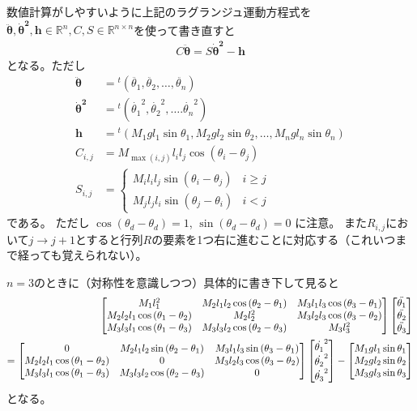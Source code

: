 \documentclass{jsarticle}
\newcommand{\eqa}[1]{\begin{align}#1\end{align}}
\newcommand{\cost}[2]{\cos\left(\theta_{#1}-\theta_{#2}\right)}
\newcommand{\sint}[2]{\sin\left(\theta_{#1}-\theta_{#2}\right)}
\newcommand{\dott}[1]{\dot{\theta_{#1}}}
\newcommand{\ddott}[1]{\ddot{\theta_{#1}}}
\begin{document}
数値計算がしやすいように上記のラグランジュ運動方程式を$\bm{\ddot{\theta}}, \bm{\dot{\theta}^2}, \bm{h} \in \mathbb{R}^n, C, S \in \mathbb{R}^{n\times n}$を使って書き直すと
\eqa{
	C \bm{\ddot{\theta}} = S \bm{\dot{\theta}^2} - \bm{h}
}
となる。ただし
\eqa{
	\bm{\ddot{\theta}} &= {}^t(\ddott{1}, \ddott{2}, \dots, \ddott{n}) \\
	\bm{\dot{\theta}^2} &= {}^t(\dott{1}^2, \dott{2}^2, \dots. \dott{n}^2) \\
	\bm{h} &= {}^t(M_1 g l_1 \sin\theta_1, M_2 g l_2 \sin\theta_2, \dots, M_n g l_n \sin\theta_n) \\
	C_{i,j} &= M_{\max(i, j)} l_i l_j \cost{i}{j} \\
	S_{i,j} &= \begin{cases}
		M_i l_i l_j \sint{i}{j} & \text{$i \ge j$}\\
		M_j l_j l_i \sint{j}{i} & \text{$i < j$}
	\end{cases}
}
である。
ただし $\cost{d}{d} = 1$, $\sint{d}{d} = 0$ に注意。
また$R_{i,j}$において$j\rightarrow j+1$とすると行列$R$の要素を1つ右に進むことに対応する（これいつまで経っても覚えられない）。

$n=3$のときに（対称性を意識しつつ）具体的に書き下して見ると
\eqa{
	\begin{bmatrix}
		M_1 l_1^2 & M_2 l_1 l_2 \cost{2}{1} & M_3 l_1 l_3 \cost{3}{1} \\
		M_2 l_2 l_1 \cost{1}{2} & M_2 l_2^2 & M_3 l_2 l_3 \cost{3}{2} \\
		M_3 l_3 l_1 \cost{1}{3} & M_3 l_3 l_2 \cost{2}{3} & M_3 l_3^2
	\end{bmatrix}
	\begin{bmatrix}
		\ddott{1} \\ \ddott{2} \\ \ddott{3}
	\end{bmatrix} \notag\\
	=
	\begin{bmatrix}
		0 & M_2 l_1 l_2 \sint{2}{1} & M_3 l_1 l_3 \sint{3}{1} \\
		M_2 l_2 l_1 \cost{1}{2} & 0 & M_3 l_2 l_3 \cost{3}{2} \\
		M_3 l_3 l_1 \cost{1}{3} & M_3 l_3 l_2 \cost{2}{3} & 0
	\end{bmatrix}
	\begin{bmatrix}
		\dott{1}^2 \\ \dott{2}^2 \\ \dott{3}^2
	\end{bmatrix}
	-
	\begin{bmatrix}
		M_1 g l_1 \sin\theta_1 \\ M_2 g l_2 \sin\theta_2 \\ M_3 g l_3 \sin\theta_3
	\end{bmatrix}
}
となる。
\end{document}
